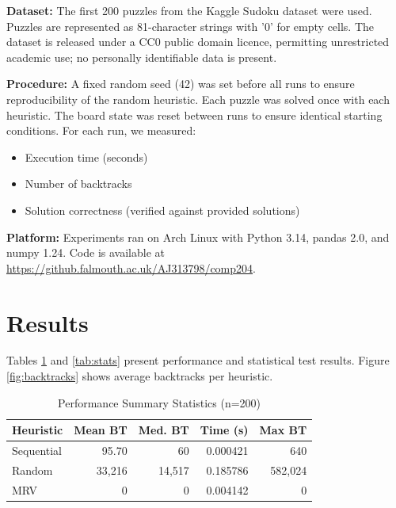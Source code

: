 \documentclass[conference]{IEEEtran}
\begin{document}
\textbf{Dataset:} The first 200 puzzles from the Kaggle Sudoku dataset \cite{kaggle_sudoku} were used. Puzzles are represented as 81-character strings with '0' for empty cells. The dataset is released under a CC0 public domain licence, permitting unrestricted academic use; no personally identifiable data is present.

\textbf{Procedure:} A fixed random seed (42) was set before all runs to ensure reproducibility of the random heuristic. Each puzzle was solved once with each heuristic. The board state was reset between runs to ensure identical starting conditions. For each run, we measured:
\begin{itemize}
    \item Execution time (seconds)
    \item Number of backtracks
    \item Solution correctness (verified against provided solutions)
\end{itemize}

\textbf{Platform:} Experiments ran on Arch Linux with Python 3.14, pandas 2.0, and numpy 1.24. Code is available at \url{https://github.falmouth.ac.uk/AJ313798/comp204}.

\section{Results}

Tables \ref{tab:summary} and \ref{tab:stats} present performance and statistical test results. Figure \ref{fig:backtracks} shows average backtracks per heuristic.

\begin{table}[htbp]
\caption{Performance Summary Statistics (n=200)}
\begin{center}
\footnotesize
\begin{tabular}{|l|r|r|r|r|}
\hline
\textbf{Heuristic} & \textbf{Mean BT} & \textbf{Med. BT} & \textbf{Time (s)} & \textbf{Max BT} \\
\hline
Sequential & 95.70  & 60      & 0.000421 & 640 \\
Random     & 33,216 & 14,517  & 0.185786 & 582,024 \\
MRV        & 0      & 0       & 0.004142 & 0 \\
\hline
\end{tabular}
\label{tab:summary}
\end{center}
\end{table}
\end{document}
